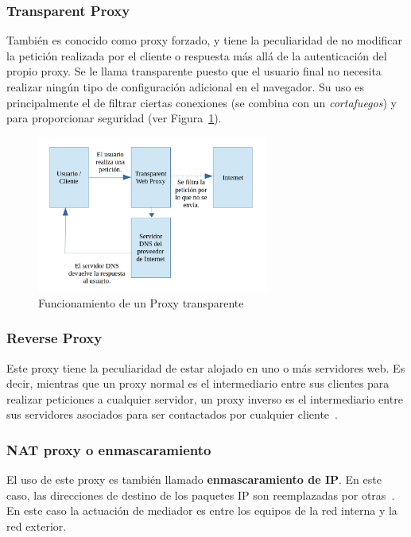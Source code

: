 \subsubsection{Transparent Proxy}

También es conocido como proxy forzado, y tiene la peculiaridad de no modificar la petición realizada por el cliente o respuesta más allá de la autenticación del propio proxy.
Se le llama transparente puesto que el usuario final no necesita realizar ningún tipo de configuración adicional en el navegador.
Su uso es principalmente el de filtrar ciertas conexiones (se combina con un \textit{cortafuegos}) y para proporcionar seguridad (ver Figura~\ref{fig:trans_proxy}).

\begin{figure}[H]
	\centerline{
		\mbox{\includegraphics[width=3.00in]{images/proxy_transparent.png}}
	}
	\caption{Funcionamiento de un Proxy transparente~\cite{article:proxy_trans}}
	\label{fig:trans_proxy}
\end{figure}

\subsubsection{Reverse Proxy}

Este proxy tiene la peculiaridad de estar alojado en uno o más servidores web.
Es decir, mientras que un proxy normal es el intermediario entre sus clientes para realizar peticiones a cualquier servidor, un proxy inverso es el intermediario entre sus servidores asociados para ser contactados por cualquier cliente~\cite{article:proxy_rev}.

\subsubsection{NAT proxy o enmascaramiento}

El uso de este proxy es también llamado \textbf{enmascaramiento de IP}. En este caso, las direcciones de destino de los paquetes IP son reemplazadas por otras~\cite{article:nat}.
En este caso la actuación de mediador es entre los equipos de la red interna y la red exterior.\\


